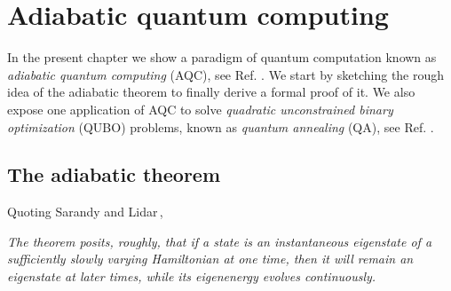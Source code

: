 
\chapter{Adiabatic quantum computing} %

\label{Chapter1} %
In the present chapter we show a paradigm of quantum computation known as \textit{adiabatic quantum computing} (AQC), see Ref. \cite{Farhi2000QuantumEvolution}. We start by sketching the rough idea of the adiabatic theorem to finally derive a formal proof of it. We also expose one application of AQC to solve \textit{quadratic unconstrained binary optimization} (QUBO) problems, known as \textit{quantum annealing} (QA), see Ref. \cite{Kadowaki1998QuantumModel}.

\section{The adiabatic theorem}
Quoting Sarandy and Lidar\,\cite{Sarandy2005AdiabaticSystems},
\begin{displayquote}
\textit{The theorem posits, roughly, that if a state is an instantaneous eigenstate of a sufficiently slowly varying Hamiltonian at one time, then it will remain an eigenstate at later times, while its eigenenergy evolves continuously.}
\end{displayquote}
